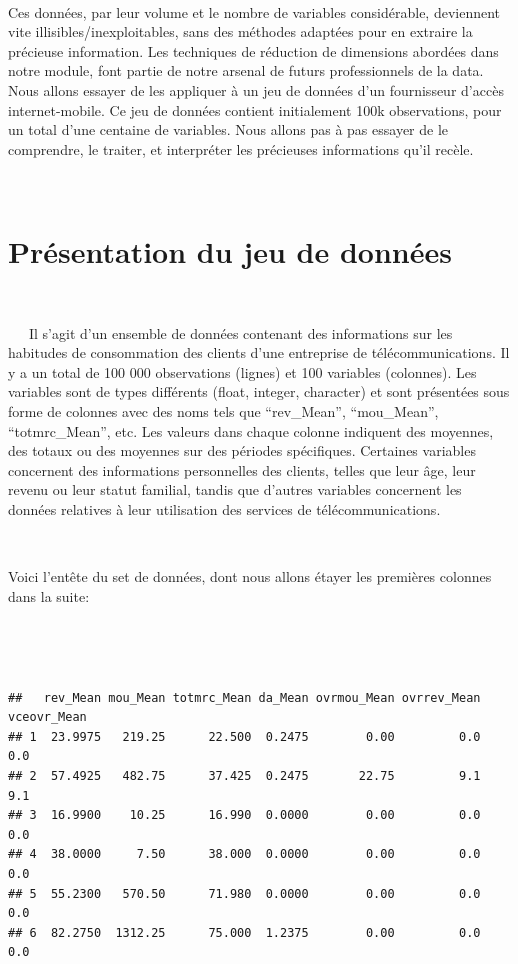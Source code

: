 \documentclass[]{imsart}
\numberwithin{equation}{section}
\theoremstyle{plain}
\begin{document}
~

Ces données, par leur volume et le nombre de variables considérable, deviennent vite illisibles/inexploitables, sans des méthodes adaptées pour en extraire la précieuse information. Les techniques de réduction de dimensions abordées dans notre module, font partie de notre arsenal de futurs professionnels de la data. Nous allons essayer de les appliquer à un jeu de données d'un fournisseur d'accès internet-mobile. Ce jeu de données contient initialement 100k observations, pour un total d'une centaine de variables. Nous allons pas à pas essayer de le comprendre, le traiter, et interpréter les précieuses informations qu'il recèle.

~

\hypertarget{pruxe9sentation-du-jeu-de-donnuxe9es}{%
\section{Présentation du jeu de données}\label{pruxe9sentation-du-jeu-de-donnuxe9es}}

~

~~~Il s'agit d'un ensemble de données contenant des informations sur les habitudes de consommation des clients d'une entreprise de télécommunications. Il y a un total de 100 000 observations (lignes) et 100 variables (colonnes). Les variables sont de types différents (float, integer, character) et sont présentées sous forme de colonnes avec des noms tels que ``rev\_Mean'', ``mou\_Mean'', ``totmrc\_Mean'', etc. Les valeurs dans chaque colonne indiquent des moyennes, des totaux ou des moyennes sur des périodes spécifiques. Certaines variables concernent des informations personnelles des clients, telles que leur âge, leur revenu ou leur statut familial, tandis que d'autres variables concernent les données relatives à leur utilisation des services de télécommunications.

~

Voici l'entête du set de données, dont nous allons étayer les premières colonnes dans la suite:

~

~

\begin{verbatim}
##   rev_Mean mou_Mean totmrc_Mean da_Mean ovrmou_Mean ovrrev_Mean vceovr_Mean
## 1  23.9975   219.25      22.500  0.2475        0.00         0.0         0.0
## 2  57.4925   482.75      37.425  0.2475       22.75         9.1         9.1
## 3  16.9900    10.25      16.990  0.0000        0.00         0.0         0.0
## 4  38.0000     7.50      38.000  0.0000        0.00         0.0         0.0
## 5  55.2300   570.50      71.980  0.0000        0.00         0.0         0.0
## 6  82.2750  1312.25      75.000  1.2375        0.00         0.0         0.0
\end{verbatim}
\end{document}
